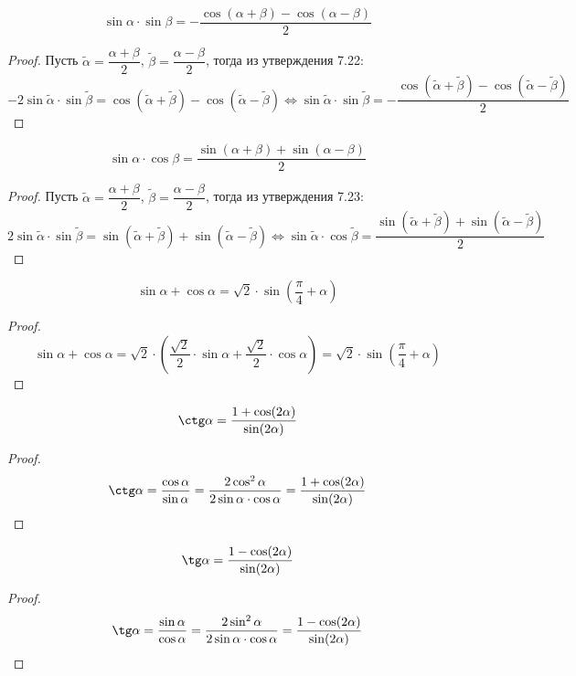 \documentclass[12pt]{article}
\begin{document}
    \begin{statement}
        $$\sin\alpha\cdot\sin\beta=-\dfrac{\cos(\alpha+\beta)-\cos(\alpha-\beta)}{2}$$
    \end{statement}
    \begin{proof}
        Пусть $\tilde{\alpha} = \dfrac{\alpha+\beta}{2}$, $\tilde{\beta} = \dfrac{\alpha-\beta}{2}$, тогда из утверждения 7.22:
        $$-2\sin\tilde{\alpha}\cdot\sin\tilde{\beta}=\cos(\tilde{\alpha}+\tilde{\beta})-\cos(\tilde{\alpha}-\tilde{\beta})\Longleftrightarrow \sin\tilde{\alpha}\cdot\sin\tilde{\beta}=-\dfrac{\cos(\tilde{\alpha}+\tilde{\beta})-\cos(\tilde{\alpha}-\tilde{\beta})}{2}$$
    \end{proof}
    \begin{statement}
        $$\sin\alpha\cdot\cos\beta=\dfrac{\sin(\alpha+\beta)+\sin(\alpha-\beta)}{2}$$
    \end{statement}
    \begin{proof}
        Пусть $\tilde{\alpha} = \dfrac{\alpha+\beta}{2}$, $\tilde{\beta} = \dfrac{\alpha-\beta}{2}$, тогда из утверждения 7.23:
        $$2\sin\tilde{\alpha}\cdot\sin\tilde{\beta}=\sin(\tilde{\alpha}+\tilde{\beta})+\sin(\tilde{\alpha}-\tilde{\beta})\Longleftrightarrow \sin\tilde{\alpha}\cdot\cos\tilde{\beta}=\dfrac{\sin(\tilde{\alpha}+\tilde{\beta})+\sin(\tilde{\alpha}-\tilde{\beta})}{2}$$
    \end{proof}
    \begin{statement}
        $$\sin\alpha+\cos\alpha=\sqrt{2}\cdot\sin\left(\dfrac{\pi}{4}+\alpha\right)$$
    \end{statement}
    \begin{proof}
        $$\sin\alpha+\cos\alpha=\sqrt{2}\cdot\left(\dfrac{\sqrt{2}}{2}\cdot\sin\alpha+\dfrac{\sqrt{2}}{2}\cdot\cos\alpha\right)=\sqrt{2}\cdot\sin\left(\dfrac{\pi}{4}+\alpha\right)$$
    \end{proof}
    \begin{statement}
        $$\ctg\alpha=\dfrac{1+\cos(2\alpha)}{\sin(2\alpha)}$$
    \end{statement}
    \begin{proof}
        $$\ctg\alpha=\dfrac{\cos\alpha}{\sin\alpha}=\dfrac{2\cos^2\alpha}{2\sin\alpha\cdot\cos\alpha}=\dfrac{1+\cos(2\alpha)}{\sin(2\alpha)}$$
    \end{proof}
    \begin{statement}
        $$\tg\alpha=\dfrac{1-\cos(2\alpha)}{\sin(2\alpha)}$$
    \end{statement}
    \begin{proof}
        $$\tg\alpha=\dfrac{\sin\alpha}{\cos\alpha}=\dfrac{2\sin^2\alpha}{2\sin\alpha\cdot\cos\alpha}=\dfrac{1-\cos(2\alpha)}{\sin(2\alpha)}$$
    \end{proof}
\end{document}
